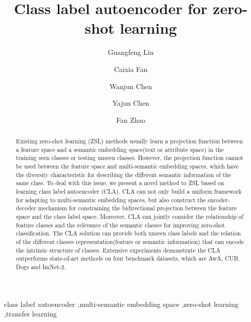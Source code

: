 \documentclass[review]{elsarticle}
\begin{document}
\begin{frontmatter}

\title{Class label autoencoder for zero-shot learning}

\author[mymainaddress]{Guangfeng Lin}


\author[mymainaddress]{Caixia Fan}
\author[mymainaddress]{Wanjun Chen}
\author[mymainaddress]{Yajun Chen}
\author[mymainaddress]{Fan Zhao}


\address[mymainaddress]{Information Science Department, Xi’an University of Technology,\\
 5 South Jinhua Road, Xi'an, Shaanxi Province 710048, PR China}


\begin{abstract}
Existing zero-shot learning (ZSL) methods usually learn a projection function between a feature space and a semantic embedding space(text or attribute space) in the training seen classes or testing unseen classes. However, the projection function cannot be used between the feature space and  multi-semantic embedding spaces, which have the diversity characteristic for describing the different semantic information of the same class. To deal with this issue, we present a novel method to ZSL based on learning class label autoencoder (CLA). CLA can not only build a uniform framework for adapting to multi-semantic embedding spaces, but also construct the encoder-decoder mechanism for constraining the bidirectional projection between the feature space and the class label space. Moreover, CLA can jointly consider the relationship of feature classes and the relevance of the semantic classes for improving zero-shot classification. The CLA solution can provide both unseen class labels and the relation of the different classes representation(feature or semantic information) that can encode the intrinsic structure of classes. Extensive experiments demonstrate the CLA outperforms state-of-art methods on four benchmark datasets, which are AwA, CUB, Dogs and ImNet-2.
\end{abstract}

\begin{keyword}
class label autoencoder \sep multi-semantic embedding space \sep zero-shot learning \sep  transfer learning
\end{keyword}

\end{frontmatter}
\end{document}

